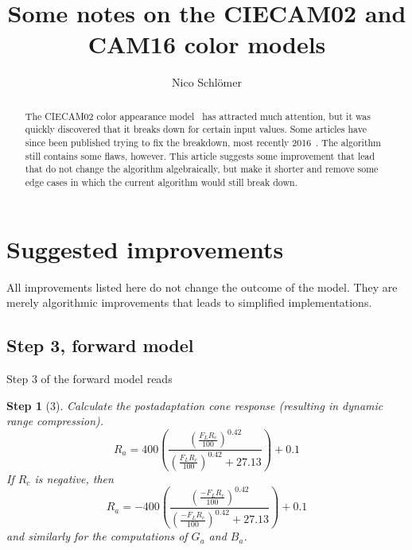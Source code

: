 \documentclass[twocolumn]{scrartcl}
\title{Some notes on the CIECAM02 and CAM16 color models}
\author{Nico Schlömer}
\theoremstyle{named}
\newtheorem*{step}{Step}
\begin{document}
\maketitle
\begin{abstract}
  The CIECAM02 color appearance model~\cite{ciecam02} has attracted much
  attention, but it was quickly discovered that it breaks down for certain
  input values. Some articles have since been published trying to fix the
  breakdown, most recently 2016~\cite{cam16}. The algorithm still contains some
  flaws, however. This article suggests some improvement that lead that do not
  change the algorithm algebraically, but make it shorter and remove some edge
  cases in which the current algorithm would still break down.
\end{abstract}


%
%
%

\section{Suggested improvements}

All improvements listed here do not change the outcome of the model.  They are
merely algorithmic improvements that leads to simplified implementations.

\subsection{Step 3, forward model}

Step 3 of the forward model reads

\begin{step}[3]
Calculate the postadaptation cone response
(resulting in dynamic range compression).
\[
  R_a = 400 \left(\frac{\left(\frac{F_L R_c}{100}\right)^{0.42}}{\left(\frac{F_L R_c}{100}\right)^{0.42} + 27.13}\right) + 0.1
\]
If $R_c$ is negative, then
\[
  R_a = -400 \left(\frac{\left(\frac{-F_L R_c}{100}\right)^{0.42}}{\left(\frac{-F_L R_c}{100}\right)^{0.42} + 27.13}\right) + 0.1
\]
and similarly for the computations of $G_a$ and $B_a$.
\end{step}
\end{document}
